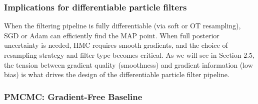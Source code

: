 \documentclass{article}
\begin{document}
\subsubsection{Implications for differentiable particle filters}
When the filtering pipeline is fully differentiable (via soft or OT resampling), SGD or Adam can efficiently find the MAP point. When full posterior uncertainty is needed, HMC requires smooth gradients, and the choice of resampling strategy and filter type becomes critical. As we will see in Section 2.5, the tension between gradient quality (smoothness) and gradient information (low bias) is what drives the design of the differentiable particle filter pipeline.


\subsubsection{PMCMC: Gradient-Free Baseline}
\end{document}
